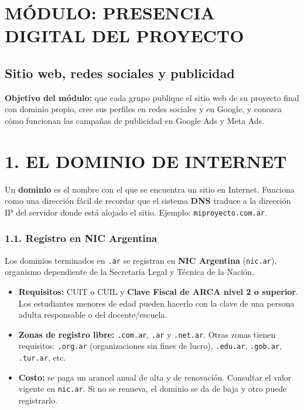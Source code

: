 \clearpage
\section*{MÓDULO: PRESENCIA DIGITAL DEL PROYECTO}
\subsection*{Sitio web, redes sociales y publicidad}

\begin{recuadro}
\textbf{Objetivo del módulo:} que cada grupo publique el sitio web de su proyecto final con
dominio propio, cree sus perfiles en redes sociales y en Google, y conozca cómo funcionan las
campañas de publicidad en Google Ads y Meta Ads.
\end{recuadro}

\section*{1. EL DOMINIO DE INTERNET}

Un \textbf{dominio} es el nombre con el que se encuentra un sitio en Internet. Funciona como
una dirección fácil de recordar que el sistema \textbf{DNS} traduce a la dirección IP del
servidor donde está alojado el sitio. Ejemplo: \texttt{miproyecto.com.ar}.

\subsubsection*{1.1. Registro en NIC Argentina}
Los dominios terminados en \texttt{.ar} se registran en \textbf{NIC Argentina}
(\texttt{nic.ar}), organismo dependiente de la Secretaría Legal y Técnica de la Nación.
\begin{itemize}
  \item \textbf{Requisitos:} CUIT o CUIL y \textbf{Clave Fiscal de ARCA nivel 2 o superior}.
        Los estudiantes menores de edad pueden hacerlo con la clave de una persona adulta
        responsable o del docente/escuela.
  \item \textbf{Zonas de registro libre:} \texttt{.com.ar}, \texttt{.ar} y \texttt{.net.ar}.
        Otras zonas tienen requisitos: \texttt{.org.ar} (organizaciones sin fines de lucro),
        \texttt{.edu.ar}, \texttt{.gob.ar}, \texttt{.tur.ar}, etc.
  \item \textbf{Costo:} se paga un arancel anual de alta y de renovación. Consultar el valor
        vigente en \texttt{nic.ar}. Si no se renueva, el dominio se da de baja y otro puede
        registrarlo.
\end{itemize}

